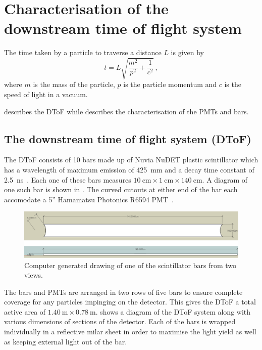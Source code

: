 \chapter{Characterisation of the downstream time of flight system}
\label{ch:hptpc_dtof_characterisation}

The time taken by a particle to traverse a distance $L$ is given by
\begin{equation}
  t = L \sqrt{ \frac{m^{2}}{p^{2}} + \frac{1}{c^{2}} } \, ,
\end{equation}
where $m$ is the mass of the particle, $p$ is the particle momentum and $c$ is the speed of light in a vacuum.

 describes the DToF while  describes the characterisation of the PMTs and bars.

\section{The downstream time of flight system (DToF)}
\label{ch:hptpc_dtof_characterisation:dtof}

The DToF consists of 10 bars made up of Nuvia NuDET plastic scintillator which has a wavelength of maximum emission of \SI{425}{\milli\metre} and a decay time constant of \SI{2.5}{\nano\second}~\cite{nuvia}.
Each one of these bars measures $\SI{10}{\centi\metre} \times \SI{1}{\centi\metre} \times \SI{140}{\centi\metre}$.
A diagram of one such bar is shown in .
The curved cutouts at either end of the bar each accomodate a 5'' Hamamatsu Photonics R6594 PMT~\cite{hamamatsu}.

\begin{figure}
  \centering
  \includegraphics[width=.8\linewidth]{files/figures/hptpc_dtof_characterisation/barDiag}
  \caption[HPTPC DToF bar diagram]{Computer generated drawing of one of the scintillator bars from two views.}
  \label{fig:barDiag}
\end{figure}

The bars and PMTs are arranged in two rows of five bars to ensure complete coverage for any particles impinging on the detector.
This gives the DToF a total active area of $\SI{1.40}{\metre} \times \SI{0.78}{\metre}$.
 shows a diagram of the DToF system along with various dimensions of sections of the detector.
Each of the bars is wrapped individually in a reflective milar sheet in order to maximise the light yield as well as keeping external light out of the bar.

